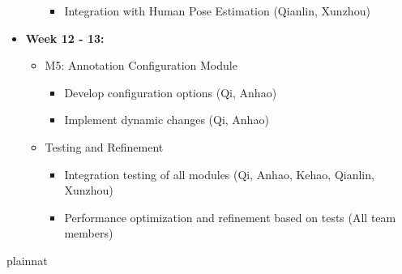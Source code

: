 \documentclass[12pt, titlepage]{article}
\begin{document}
\begin{itemize}
\begin{itemize}
\begin{itemize}
          \item Integration with Human Pose Estimation (Qianlin, Xunzhou)
      \end{itemize}
  \end{itemize}
  \item \textbf{Week 12 - 13:}
  \begin{itemize}
      \item M5: Annotation Configuration Module
      \begin{itemize}
          \item Develop configuration options (Qi, Anhao)
          \item Implement dynamic changes (Qi, Anhao)
      \end{itemize}
      \item Testing and Refinement
      \begin{itemize}
          \item Integration testing of all modules (Qi, Anhao, Kehao, Qianlin, Xunzhou)
          \item Performance optimization and refinement based on tests (All team members)
      \end{itemize}
  \end{itemize}
\end{itemize}


 {plainnat}


\newpage{}
\end{document}
